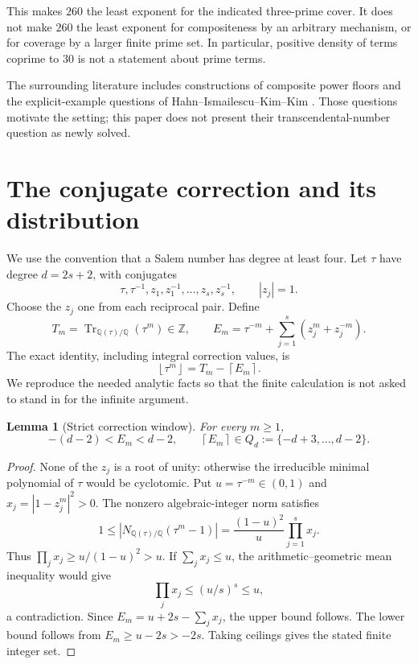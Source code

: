 \documentclass[11pt,a4paper]{article}
\newtheorem{lemma}[theorem]{Lemma}
\theoremstyle{definition}\newtheorem{definition}[theorem]{Definition}
\theoremstyle{remark}\newtheorem{remark}[theorem]{Remark}
\newcommand{\Z}{\mathbb Z}\newcommand{\Q}{\mathbb Q}
\newcommand{\Tr}{\operatorname{Tr}}\newcommand{\ord}{\operatorname{ord}}
\newcommand{\floor}[1]{\left\lfloor#1\right\rfloor}
\newcommand{\ceil}[1]{\left\lceil#1\right\rceil}
\begin{document}
This makes $260$ the least exponent for the indicated three-prime cover. It does not make $260$ the least exponent for compositeness by an arbitrary mechanism, or for coverage by a larger finite prime set. In particular, positive density of terms coprime to $30$ is not a statement about prime terms.

The surrounding literature includes constructions of composite power floors and the explicit-example questions of Hahn--Ismailescu--Kim--Kim \cite{HIKK}. Those questions motivate the setting; this paper does not present their transcendental-number question as newly solved. 

\section{The conjugate correction and its distribution}
We use the convention that a Salem number has degree at least four. Let $\tau$ have degree $d=2s+2$, with conjugates
\[
 \tau,\tau^{-1},z_1,z_1^{-1},\ldots,z_s,z_s^{-1},
 \qquad |z_j|=1.
\]
Choose the $z_j$ one from each reciprocal pair. Define
\[
 T_m=\Tr_{\Q(\tau)/\Q}(\tau^m)\in\Z,
 \qquad E_m=\tau^{-m}+\sum_{j=1}^s(z_j^m+z_j^{-m}).
\]
The exact identity, including integral correction values, is
\begin{equation}\label{eq:floor}
 \floor{\tau^m}=T_m-\ceil{E_m}.
\end{equation}
We reproduce the needed analytic facts so that the finite calculation is not asked to stand in for the infinite argument.

\begin{lemma}[Strict correction window]\label{lem:window}
For every $m\ge1$,
\[
 -(d-2)<E_m<d-2,
 \qquad \ceil{E_m}\in Q_d:=\{-d+3,\ldots,d-2\}.
\]
\end{lemma}
\begin{proof}
None of the $z_j$ is a root of unity: otherwise the irreducible minimal polynomial of $\tau$ would be cyclotomic. Put $u=\tau^{-m}\in(0,1)$ and $x_j=|1-z_j^m|^2>0$. The nonzero algebraic-integer norm satisfies
\[
 1\le\left|N_{\Q(\tau)/\Q}(\tau^m-1)\right|
   =\frac{(1-u)^2}{u}\prod_{j=1}^sx_j.
\]
Thus $\prod_jx_j\ge u/(1-u)^2>u$. If $\sum_jx_j\le u$, the arithmetic--geometric mean inequality would give
\[
 \prod_jx_j\le(u/s)^s\le u,
\]
a contradiction. Since $E_m=u+2s-\sum_jx_j$, the upper bound follows. The lower bound follows from $E_m\ge u-2s>-2s$. Taking ceilings gives the stated finite integer set.
\end{proof}
\end{document}
